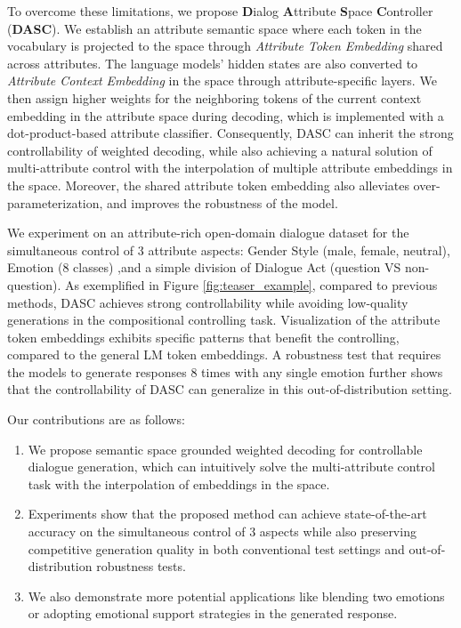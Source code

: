 To overcome these limitations, we propose \textbf{D}ialog \textbf{A}ttribute \textbf{S}pace \textbf{C}ontroller (\textbf{DASC}). We establish an attribute semantic space where each token in the vocabulary is projected to the space through \textit{Attribute Token Embedding} shared across attributes. The language models' hidden states are also converted to \textit{Attribute Context Embedding} in the space through attribute-specific layers. We then assign higher weights for the neighboring tokens of the current context embedding in the attribute space during decoding, which is implemented with a dot-product-based attribute classifier.
Consequently, DASC can inherit the strong controllability of weighted decoding, while also achieving a natural solution of multi-attribute control with the interpolation of multiple attribute embeddings in the space. Moreover, the shared attribute token embedding also alleviates over-parameterization, and improves the robustness of the model.

We experiment on an attribute-rich open-domain dialogue dataset \citep{xu2022long} for the simultaneous control of 3 attribute aspects: Gender Style (male, female, neutral), Emotion (8 classes) ,and a simple division of Dialogue Act (question VS non-question). 
As exemplified in Figure \ref{fig:teaser_example}, 
compared to previous methods, DASC achieves strong controllability while 
avoiding low-quality generations in the compositional controlling task. 
Visualization of the attribute token embeddings exhibits specific patterns 
that benefit the controlling, compared to the general LM token embeddings. 
A robustness test that requires the models to generate responses 8 times 
with any single emotion further shows that the controllability of 
DASC can generalize in this out-of-distribution setting.  

Our contributions are as follows: 
\begin{enumerate}
    \item We propose semantic space grounded weighted decoding for controllable dialogue generation, which can intuitively solve the multi-attribute control task with the interpolation of embeddings in the space.
    \item Experiments show that the proposed method can achieve state-of-the-art accuracy on the simultaneous control of 3 aspects while also preserving competitive generation quality in both conventional test settings and out-of-distribution robustness tests.
    \item We also demonstrate more potential applications like blending two emotions or adopting emotional support strategies in the generated response.
\end{enumerate}

